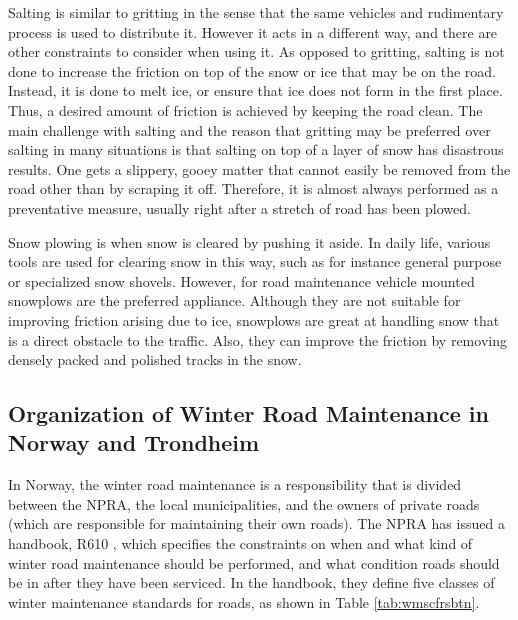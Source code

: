 Salting is similar to gritting in the sense that the same vehicles and rudimentary process is used to distribute it. However it acts in a different way, and there are other constraints to consider when using it. As opposed to gritting, salting is not done to increase the friction on top of the snow or ice that may be on the road. Instead, it is done to melt ice, or ensure that ice does not form in the first place. Thus, a desired amount of friction is achieved by keeping the road clean. The main challenge with salting and the reason that gritting may be preferred over salting in many situations is that salting on top of a layer of snow has disastrous results. One gets a slippery, gooey matter that cannot easily be removed from the road other than by scraping it off. Therefore, it is almost always performed as a preventative measure, usually right after a stretch of road has been plowed.

Snow plowing is when snow is cleared by pushing it aside. In daily life, various tools are used for clearing snow in this way, such as for instance general purpose or specialized snow shovels. However, for road maintenance vehicle mounted snowplows are the preferred appliance. Although they are not suitable for improving friction arising due to ice, snowplows are great at handling snow that is a direct obstacle to the traffic. Also, they can improve the friction by removing densely packed and polished tracks in the snow.

\subsection{Organization of Winter Road Maintenance in Norway and Trondheim} %
\label{ssub:how_winter_road_maintenance_is_organized_in_norway_and_trondheim}

In Norway, the winter road maintenance is a responsibility that is divided between the NPRA, the local municipalities, and the owners of private roads (which are responsible for maintaining their own roads). The NPRA has issued a handbook, R610 \citep{svvR610}, which specifies the constraints on when and what kind of winter road maintenance should be performed, and what condition roads should be in after they have been serviced. In the handbook, they define five classes of winter maintenance standards for roads, as shown in Table \ref{tab:wmscfrsbtn}.

